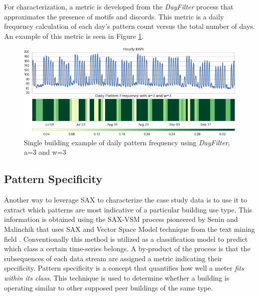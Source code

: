 For characterization, a metric is developed from the \emph{DayFilter} process that approximates the presence of motifs and discords. This metric is a daily frequency calculation of each day's pattern count versus the total number of days. An example of this metric is seen in Figure \ref{fig:dayfilter_single}.

\begin{figure}[ht!]
\begin{center}
\includegraphics[width=1\columnwidth]{figures/dayfilter_example1/dayfilter_example1}
\caption{Single building example of daily pattern frequency using \emph{DayFilter}, a=3 and w=3
\label{fig:dayfilter_single}%
}
\end{center}
\end{figure}

\subsection{Pattern Specificity}
\label{sec:patternspec}

Another way to leverage SAX to characterize the case study data is to use it to extract which patterns are most indicative of a particular building use type. This information is obtained using the SAX-VSM process pioneered by Senin and Malinchik that uses SAX and Vector Space Model technique from the text mining field \citep{Senin_2013}. Conventionally this method is utilized as a classification model to predict which class a certain time-series belongs. A by-product of the process is that the subsequences of each data stream are assigned a metric indicating their specificity. Pattern specificity is a concept that quantifies how well a meter \emph{fits within its class}. This technique is used to determine whether a building is operating similar to other supposed peer buildings of the same type.

